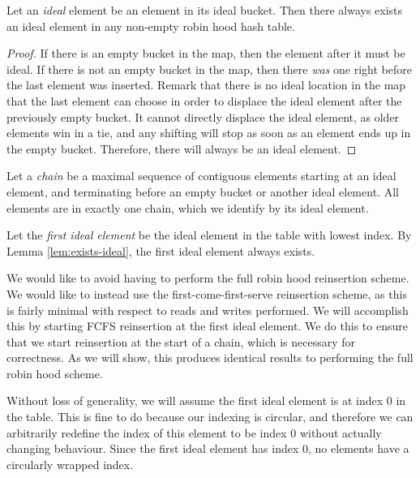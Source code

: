 \documentclass{cccg13}
\begin{document}
\begin{lemma} \label{lem:exists-ideal}
  Let an \emph{ideal} element be an element in its ideal bucket. Then there always exists an ideal element in any non-empty robin hood hash table.
\end{lemma}

\begin{proof}
  If there is an empty bucket in the map, then the element after it must be ideal. If there is not an empty bucket in the map, then there \emph{was} one right before the last element was inserted. Remark that there is no ideal location in the map that the last element can choose in order to displace the ideal element after the previously empty bucket. It cannot directly displace the ideal element, as older elements win in a tie, and any shifting will stop as soon as an element ends up in the empty bucket. Therefore, there will always be an ideal element.
\end{proof}

\begin{defn}
  Let a \emph{chain} be a maximal sequence of contiguous elements starting at an ideal element, and terminating before an empty bucket or another ideal element. All elements are in exactly one chain, which we identify by its ideal element.
\end{defn}

\begin{defn}
  Let the \emph{first ideal element} be the ideal element in the table with lowest index. By Lemma \ref{lem:exists-ideal}, the first ideal element always exists.
\end{defn}

We would like to avoid having to perform the full robin hood reinsertion scheme. We would like to instead use the first-come-first-serve reinsertion scheme, as this is fairly minimal with respect to reads and writes performed. We will accomplish this by starting FCFS reinsertion at the first ideal element. We do this to ensure that we start reinsertion at the start of a chain, which is necessary for correctness. As we will show, this produces identical results to performing the full robin hood scheme.

Without loss of generality, we will assume the first ideal element is at index $0$ in the table. This is fine to do because our indexing is circular, and therefore we can arbitrarily redefine the index of this element to be index $0$ without actually changing behaviour. Since the first ideal element has index $0$, no elements have a circularly wrapped index.
\end{document}
